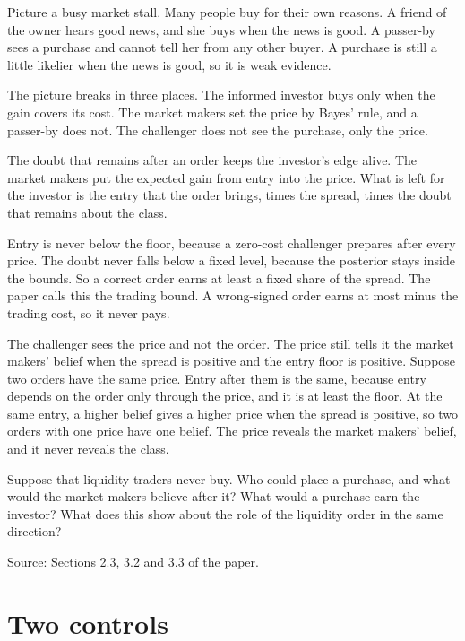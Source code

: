 \begin{analogy}
Picture a busy market stall. Many people buy for their own reasons. A friend of the owner hears good news, and she buys when the news is good. A passer-by sees a purchase and cannot tell her from any other buyer. A purchase is still a little likelier when the news is good, so it is weak evidence.

The picture breaks in three places. The informed investor buys only when the gain covers its cost. The market makers set the price by Bayes' rule, and a passer-by does not. The challenger does not see the purchase, only the price.
\end{analogy}

The doubt that remains after an order keeps the investor's edge alive. The market makers put the expected gain from entry into the price. What is left for the investor is the entry that the order brings, times the spread, times the doubt that remains about the class.

Entry is never below the floor, because a zero-cost challenger prepares after every price. The doubt never falls below a fixed level, because the posterior stays inside the bounds. So a correct order earns at least a fixed share of the spread. The paper calls this the trading bound. A wrong-signed order earns at most minus the trading cost, so it never pays.

The challenger sees the price and not the order. The price still tells it the market makers' belief when the spread is positive and the entry floor is positive. Suppose two orders have the same price. Entry after them is the same, because entry depends on the order only through the price, and it is at least the floor. At the same entry, a higher belief gives a higher price when the spread is positive, so two orders with one price have one belief. The price reveals the market makers' belief, and it never reveals the class.

\begin{checkyourself}
Suppose that liquidity traders never buy. Who could place a purchase, and what would the market makers believe after it? What would a purchase earn the investor? What does this show about the role of the liquidity order in the same direction?\label{q:story-doubt}
\end{checkyourself}

{\small\color{notegrey}Source: Sections 2.3, 3.2 and 3.3 of the paper.}

\section{Two controls}\label{sec:story-controls}

